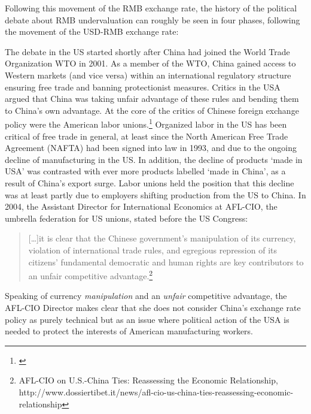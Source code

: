 Following this movement of the RMB exchange rate, the history of the political debate about RMB undervaluation can roughly be seen in four phases, following the movement of the USD-RMB exchange rate:

The debate in the US started shortly after China had joined the World Trade Organization WTO in 2001. As a member of the WTO, China gained access to Western markets (and vice versa) within an international regulatory structure ensuring free trade and banning protectionist measures. Critics in the USA argued that China was taking unfair advantage of these rules and bending them to China's own advantage. At the core of the critics of Chinese foreign exchange policy were the American labor unions.\footnote{\cite[pp. 14]{Levy2011}} Organized labor in the US has been critical of free trade in general, at least since the North American Free Trade Agreement (NAFTA) had been signed into law in 1993, and due to the ongoing decline of manufacturing in the US. In addition, the decline of products `made in USA'  was contrasted with ever more products labelled `made in China', as a result of China's export surge. Labor unions held the position that this decline was at least partly due to employers shifting production from the US to China. In 2004, the Assistant Director for International Economics at AFL-CIO, the umbrella federation for US unions, stated before the US Congress: 

\begin{quote}
[\dots]it is clear that the Chinese government’s manipulation of its currency, violation of international trade rules, and egregious repression of its citizens’ fundamental democratic and human rights are key contributors to an unfair competitive advantage.\footnote{AFL-CIO on U.S.-China Ties: Reassessing the Economic Relationship, http://www.dossiertibet.it/news/afl-cio-us-china-ties-reassessing-economic-relationship}
\end{quote}

Speaking of currency \emph{manipulation} and an \emph{unfair} competitive advantage, the AFL-CIO Director makes clear that she does not consider China's exchange rate policy as purely technical but as an issue where political action of the USA is needed to protect the interests of American manufacturing workers.

